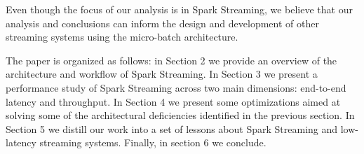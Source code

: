 Even though the focus of our analysis is in Spark Streaming, we believe that our analysis and conclusions can inform the design and development of other streaming systems using the micro-batch architecture.

The paper is organized as follows: 
in Section 2 we provide an overview of the architecture and workflow of Spark Streaming. 
In Section 3 we present a performance study of Spark Streaming across two main dimensions: end-to-end latency and throughput.
In Section 4 we present some optimizations aimed at solving some of the architectural deficiencies identified in the previous section.
In Section 5 we distill our work into a set of lessons about Spark Streaming and low-latency streaming systems.
Finally, in section 6 we conclude.
